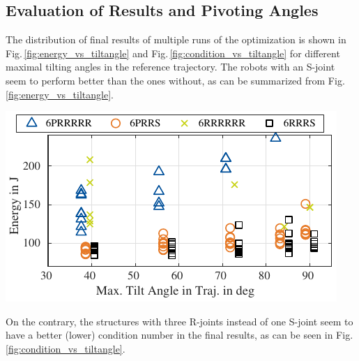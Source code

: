 \documentclass[fleqn,a4paper,10pt]{article}
\renewenvironment{figure}
  {\par\vspace{6pt}\noindent\minipage{\linewidth}}
  {\endminipage\par\vspace{6pt}}
\begin{document}
\begin{multicols}{2}
\subsection{Evaluation of Results and Pivoting Angles}
\label{sec:res_condition_pivoting}

The distribution of final results of multiple runs of the optimization is shown in Fig.\,\ref{fig:energy_vs_tiltangle} and Fig.\,\ref{fig:condition_vs_tiltangle} for different maximal tilting angles in the reference trajectory.
The robots with an S-joint seem to perform better than the ones without, as can be summarized from Fig.\,\ref{fig:energy_vs_tiltangle}.


\begin{figure}
\centering
\includegraphics{./Bilder/figure_energy_vs_tiltangle.pdf}
\vspace{-0.4cm} %
\label{fig:energy_vs_tiltangle}
\end{figure}

On the contrary, the structures with three R-joints instead of one S-joint seem to have a better (lower) condition number in the final results, as can be seen in Fig.\,\ref{fig:condition_vs_tiltangle}.


\end{multicols}
\end{document}
